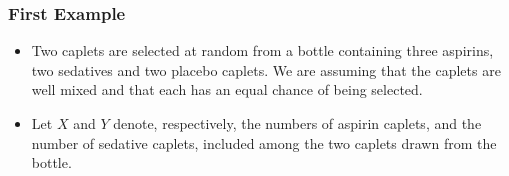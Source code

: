 \documentclass[notes=show,handout]{beamer}
\newenvironment{stepitemize}{\begin{itemize}[<+->]}{\end{itemize} }
\begin{document}
\begin{frame}%

\frametitle{First Example }

\begin{example}
\begin{stepitemize}
\item Two caplets are selected at random from a bottle containing three
aspirins, two sedatives and two placebo caplets. We are assuming that the caplets are well mixed and that each has an
equal chance of being selected.

\item Let $X$ and $Y$ denote, respectively, the numbers of aspirin caplets,
and the number of sedative caplets, included among the two caplets drawn
from the bottle.
%
%
\end{stepitemize}
\end{example}

\end{frame}%
\end{document}
